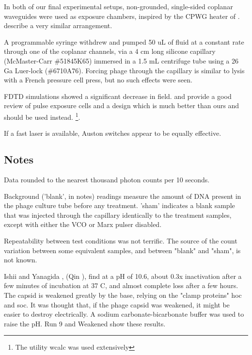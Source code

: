 \documentclass[paper.tex]{subfiles}
\begin{document}
\begin{multicols}{1}
In both of our final experimental setups, non-grounded, single-sided coplanar waveguides were used as exposure chambers, inspired by the CPWG heater of \cite{Microwave2007}. \cite{Nanosecond2006} describe a very similar arrangement. 

A programmable syringe withdrew and pumped 50 uL of fluid at a constant rate through one of the coplanar channels, via a 4 cm long silicone capillary (McMaster-Carr \#51845K65) immersed in a 1.5 mL centrifuge tube using a 26 Ga Luer-lock (\#6710A76). Forcing phage through the capillary is similar to lysis with a French pressure cell press, but no such effects were seen.

 FDTD simulations showed a significant decrease in field. \cite{Microchamber2011} and \cite{Characterization2012} provide a good review of pulse exposure cells and a design which is much better than ours and should be used instead. \cite{Electromagnetic1989} \footnote{The utility wcalc was used extensively}.

If a fast laser is available, Auston switches appear to be equally effective.



\subsection{Notes}

%



Data rounded to the nearest thousand photon counts per 10 seconds. %

Background ('blank', in notes) readings measure the amount of DNA present in the phage culture tube before any treatment. 'sham' indicates a blank sample that was injected through the capillary identically to the treatment samples, except with either the VCO or Marx pulser disabled.

Repeatability between test conditions was not terrific. The source of the  count variation between some equivalent samples, and between "blank" and "sham", is not known.

Ishii and Yanagida \cite{two1977}, (Qin \cite{Structure2010}), find at a pH of 10.6, about 0.3x inactivation after a few minutes of incubation at 37 C, and almost complete loss after a few hours. The capsid is weakened greatly by the base, relying on the "clamp proteins" hoc and soc. It was thought that, if the phage capsid was weakened, it might be easier to destroy electrically. A sodium carbonate-bicarbonate buffer was used to raise the pH. Run 9 and Weakened show these results. 


\end{multicols}
\end{document}
